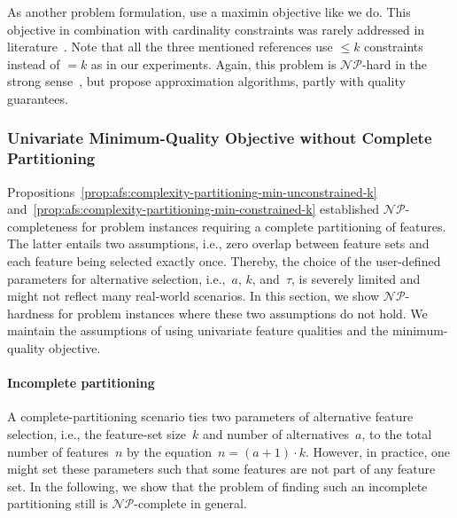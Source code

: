 \documentclass{article}
\theoremstyle{definition}
\begin{document}
As another problem formulation, \cite{chen20023partitioning, he2003kappa, lawrinenko2018reduction} use a maximin objective like we do.
This objective in combination with cardinality constraints was rarely addressed in literature~\cite{lawrinenko2018reduction}.
Note that all the three mentioned references use $\leq k$ constraints instead of $= k$ as in our experiments.
Again, this problem is $\mathcal{NP}$-hard in the strong sense~\cite{he2003kappa, lawrinenko2018reduction}, but \cite{chen20023partitioning, he2003kappa, lawrinenko2018reduction} propose approximation algorithms, partly with quality guarantees.

\subsubsection{Univariate Minimum-Quality Objective without Complete Partitioning}
\label{sec:afs:appendix:complexity:uni:min-no-partitioning}

Propositions~\ref{prop:afs:complexity-partitioning-min-unconstrained-k} and~\ref{prop:afs:complexity-partitioning-min-constrained-k} established $\mathcal{NP}$-completeness for problem instances requiring a complete partitioning of features.
The latter entails two assumptions, i.e., zero overlap between feature sets and each feature being selected exactly once.
Thereby, the choice of the user-defined parameters for alternative selection, i.e.,~$a$, $k$, and~$\tau$, is severely limited and might not reflect many real-world scenarios.
In this section, we show $\mathcal{NP}$-hardness for problem instances where these two assumptions do not hold.
We maintain the assumptions of using univariate feature qualities and the minimum-quality objective.

\paragraph{Incomplete partitioning}

A complete-partitioning scenario ties two parameters of alternative feature selection, i.e., the feature-set size~$k$ and number of alternatives~$a$, to the total number of features~$n$ by the equation~$n = (a+1) \cdot k$.
However, in practice, one might set these parameters such that some features are not part of any feature set.
In the following, we show that the problem of finding such an incomplete partitioning still is $\mathcal{NP}$-complete in general.
\end{document}
